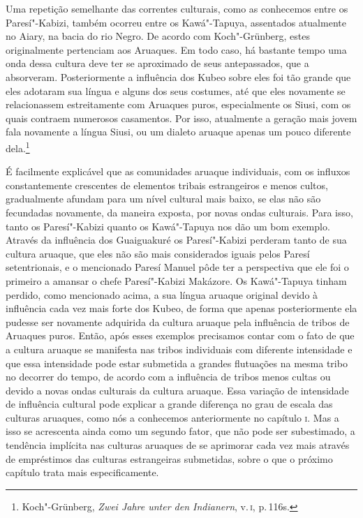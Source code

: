 Uma repetição semelhante das correntes culturais, como as conhecemos
entre os Paresí"-Kabizi, também ocorreu entre os Kawá"-Tapuya, assentados
atualmente no Aiary, na bacia do rio Negro. De acordo com Koch"-Grünberg,
estes originalmente pertenciam aos Aruaques. Em todo caso, há bastante
tempo uma onda dessa cultura deve ter se aproximado de seus
antepassados, que a absorveram. Posteriormente a influência dos Kubeo
sobre eles foi tão grande que eles adotaram sua língua e alguns dos seus
costumes, até que eles novamente se relacionassem estreitamente com
Aruaques puros, especialmente os Siusi, com os quais contraem numerosos
casamentos. Por isso, atualmente a geração mais jovem fala novamente a
língua Siusi, ou um dialeto aruaque apenas um pouco diferente
dela.\footnote{Koch"-Grünberg, \textit{Zwei Jahre unter den Indianern}, v.\,\textsc{i}, p.\,116s.}

É facilmente explicável que as comunidades aruaque individuais, com os
influxos constantemente crescentes de elementos tribais estrangeiros e
menos cultos, gradualmente afundam para um nível cultural mais baixo,
se elas não são fecundadas novamente, da maneira exposta, por novas
ondas culturais. Para isso, tanto os Paresí"-Kabizi quanto os
Kawá"-Tapuya nos dão um bom exemplo. Através da influência dos
Guaiguakuré os Paresí"-Kabizi perderam tanto de sua cultura aruaque, que
eles não são mais considerados iguais pelos Paresí setentrionais, e o
mencionado Paresí Manuel pôde ter a perspectiva que ele foi o primeiro a
amansar o chefe Paresí"-Kabizi Makázore. Os Kawá"-Tapuya tinham perdido,
como mencionado acima, a sua língua aruaque original devido à
influência cada vez mais forte dos Kubeo, de forma que apenas
posteriormente ela pudesse ser novamente adquirida da cultura aruaque
pela influência de tribos de Aruaques puros. Então, após esses exemplos
precisamos contar com o fato de que a cultura aruaque se manifesta nas
tribos individuais com diferente intensidade e que essa intensidade pode
estar submetida a grandes flutuações na mesma tribo no decorrer do
tempo, de acordo com a influência de tribos menos cultas ou devido a
novas ondas culturais da cultura aruaque. Essa variação de intensidade
de influência cultural pode explicar a grande diferença no grau de
escala das culturas aruaques, como nós a conhecemos anteriormente no
capítulo \textsc{i}. Mas a isso se acrescenta ainda como um segundo fator, que
não pode ser subestimado, a tendência implícita nas culturas aruaques de
se aprimorar cada vez mais através de empréstimos das culturas
estrangeiras submetidas, sobre o que o próximo capítulo trata mais
especificamente.



